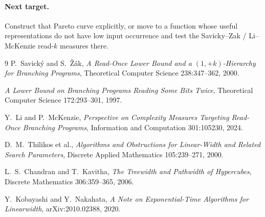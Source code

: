 \paragraph{Next target.}
Construct that Pareto curve explicitly, or move to a function whose useful representations do
not have low input occurrence and test the Savicky--Zak / Li--McKenzie read-$k$ measures
there.

\begin{thebibliography}{9}
P.~Savick\'y and S.~\v{Z}\'ak,
\emph{A Read-Once Lower Bound and a $(1,+k)$-Hierarchy for Branching Programs},
Theoretical Computer Science 238:347--362, 2000.

\emph{A Lower Bound on Branching Programs Reading Some Bits Twice},
Theoretical Computer Science 172:293--301, 1997.

Y.~Li and P.~McKenzie,
\emph{Perspective on Complexity Measures Targeting Read-Once Branching Programs},
Information and Computation 301:105230, 2024.

D.~M.~Thilikos et al.,
\emph{Algorithms and Obstructions for Linear-Width and Related Search Parameters},
Discrete Applied Mathematics 105:239--271, 2000.

L.~S.~Chandran and T.~Kavitha,
\emph{The Treewidth and Pathwidth of Hypercubes},
Discrete Mathematics 306:359--365, 2006.

Y.~Kobayashi and Y.~Nakahata,
\emph{A Note on Exponential-Time Algorithms for Linearwidth},
arXiv:2010.02388, 2020.
\end{thebibliography}

